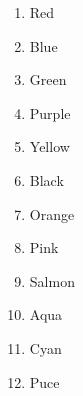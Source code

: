 \documentclass[10pt,]{article}
\theoremstyle{plain}
\theoremstyle{definition}
\theoremstyle{definition}
\theoremstyle{definition}
\theoremstyle{definition}
\theoremstyle{definition}
\theoremstyle{definition}
\numberwithin{equation}{section}
\begin{document}
\begin{multicols}{5}
\begin{enumerate}
\item\hypertarget{li-15}{}\hypertarget{p-148}{}%
Red%
\item\hypertarget{li-16}{}\hypertarget{p-149}{}%
Blue%
\item\hypertarget{li-17}{}\hypertarget{p-150}{}%
Green%
\item\hypertarget{li-18}{}\hypertarget{p-151}{}%
Purple%
\item\hypertarget{li-19}{}\hypertarget{p-152}{}%
Yellow%
\item\hypertarget{li-20}{}\hypertarget{p-153}{}%
Black%
\item\hypertarget{li-21}{}\hypertarget{p-154}{}%
Orange%
\item\hypertarget{li-22}{}\hypertarget{p-155}{}%
Pink%
\item\hypertarget{li-23}{}\hypertarget{p-156}{}%
Salmon%
\item\hypertarget{li-24}{}\hypertarget{p-157}{}%
Aqua%
\item\hypertarget{li-25}{}\hypertarget{p-158}{}%
Cyan%
\item\hypertarget{li-26}{}\hypertarget{p-159}{}%
Puce%
\end{enumerate}
\end{multicols}
\leavevmode%
\end{document}
